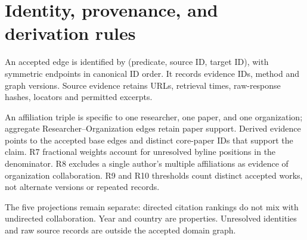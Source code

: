 \section{Identity, provenance, and derivation rules}

An accepted edge is identified by (predicate, source ID, target ID), with
symmetric endpoints in canonical ID order. It records evidence IDs, method and
graph versions. Source evidence retains URLs, retrieval times, raw-response
hashes, locators and permitted excerpts.

An affiliation triple is specific to one researcher, one paper, and one
organization; aggregate Researcher--Organization edges retain paper support.
Derived evidence points to the accepted base edges and distinct core-paper IDs
that support the claim. R7 fractional weights account for unresolved byline
positions in the denominator. R8 excludes a single author's multiple
affiliations as evidence of organization collaboration. R9 and R10 thresholds
count distinct accepted works, not alternate versions or repeated records.

The five projections remain separate: directed citation rankings do not mix
with undirected collaboration. Year and country are properties. Unresolved
identities and raw source records are outside the accepted domain graph.

\endgroup
